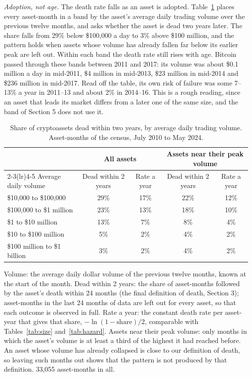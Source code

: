 \documentclass[11pt]{article}
\begin{document}
\emph{Adoption, not age.} The death rate falls as an asset is adopted. Table~\ref{tab:adoption} places every asset-month in a band by the asset's average daily trading volume over the previous twelve months, and asks whether the asset is dead two years later. The share falls from 29\% below \$100,000 a day to 3\% above \$100 million, and the pattern holds when assets whose volume has already fallen far below its earlier peak are left out. Within each band the death rate still rises with age. Bitcoin passed through these bands between 2011 and 2017: its volume was about \$0.1 million a day in mid-2011, \$4 million in mid-2013, \$23 million in mid-2014 and \$236 million in mid-2017. Read off the table, its own risk of failure was some 7--13\% a year in 2011--13 and about 2\% in 2014--16. This is a rough reading, since an asset that leads its market differs from a later one of the same size, and the band of Section 5 does not use it.

\begin{table}[ht]\centering\small
\caption{Share of cryptoassets dead within two years, by average daily trading volume. Asset-months of the census, July 2010 to May 2024.}
\label{tab:adoption}
\begin{tabular}{lcccc}
\toprule
 & \multicolumn{2}{c}{All assets} & \multicolumn{2}{c}{Assets near their peak volume} \\
\cmidrule(lr){2-3}\cmidrule(lr){4-5}
Average daily volume & Dead within 2 years & Rate a year & Dead within 2 years & Rate a year \\
\midrule
\$10,000 to \$100,000 & 29\% & 17\% & 22\% & 12\% \\
\$100,000 to \$1 million & 23\% & 13\% & 18\% & 10\% \\
\$1 to \$10 million & 13\% & 7\% & 8\% & 4\% \\
\$10 to \$100 million & 5\% & 2\% & 4\% & 2\% \\
\$100 million to \$1 billion & 3\% & 2\% & 4\% & 2\% \\
\bottomrule
\end{tabular}
\par\smallskip\parbox{0.9\textwidth}{\footnotesize Volume: the average daily dollar volume of the previous twelve months, known at the start of the month. Dead within 2 years: the share of asset-months followed by the asset's death within 24 months (the final definition of death, Section 3); asset-months in the last 24 months of data are left out for every asset, so that each outcome is observed in full. Rate a year: the constant death rate per asset-year that gives that share, $-\ln(1-\text{share})/2$, comparable with Tables~\ref{tab:size} and~\ref{tab:hazard}. Assets near their peak volume: only months in which the asset's volume is at least a third of the highest it had reached before. An asset whose volume has already collapsed is close to our definition of death, so leaving such months out shows that the pattern is not produced by that definition. 33,055 asset-months in all.}
\end{table}
\end{document}
